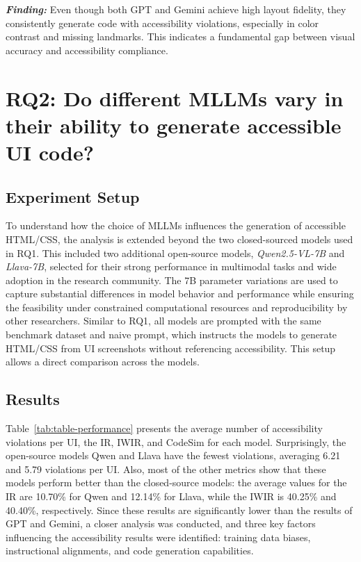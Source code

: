 \begin{center}
\begin{tcolorbox}[colback=black!5!white,colframe=black!75!black,bottom=-0.05pt,top=-0.05pt]
\textit{\textbf{Finding:}} Even though both GPT and Gemini achieve high layout fidelity, 
they consistently generate code with accessibility violations, 
especially in color contrast and missing landmarks. This indicates 
a fundamental gap between visual accuracy and accessibility compliance.
\end{tcolorbox}
\end{center}


\begingroup
    
\endgroup


\section{RQ2: Do different MLLMs vary in their ability to generate accessible UI code?}
\subsection{Experiment Setup}
To understand how the choice of MLLMs influences the generation of 
accessible HTML/CSS, the analysis is extended beyond the two 
closed-sourced models used in RQ1. This included two additional 
open-source models, \textit{Qwen2.5-VL-7B} and \textit{Llava-7B}, 
selected for their strong performance in multimodal tasks and 
wide adoption in the research community. 
The 7B parameter variations are used to capture substantial 
differences in model behavior and performance while ensuring 
the feasibility under constrained computational resources and 
reproducibility by other researchers.
Similar to RQ1, all models are prompted with the same 
benchmark dataset and naive prompt,
which instructs the models to generate HTML/CSS from UI screenshots
without referencing accessibility. This setup allows a 
direct comparison across the models.

\subsection{Results}
Table~\ref{tab:table-performance} presents the average 
number of accessibility violations per UI, the IR, IWIR, and 
CodeSim for each model. Surprisingly, the open-source models
Qwen and Llava have the fewest violations, averaging 
6.21 and 5.79 violations per UI. Also, most of the other metrics 
show that these models perform better than the closed-source
models: the average values for the IR are 10.70\% for Qwen and
12.14\% for Llava, while the IWIR is 40.25\%
and 40.40\%, respectively.
Since these results 
are significantly lower than the results of GPT and Gemini, 
a closer analysis was conducted, and three key factors 
influencing the accessibility results were identified: 
training data biases, instructional alignments, and 
code generation capabilities.

